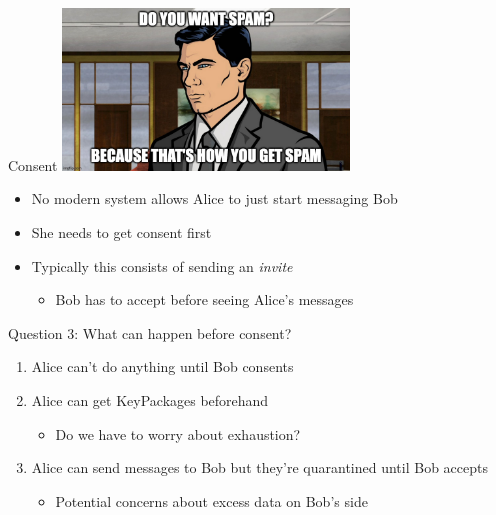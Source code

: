 \documentclass[helvetica]{beamer}
\begin{document}
\begin{frame}{Consent}
  \includegraphics[width=3in]{archer-spam}
  \begin{itemize}
  \item No modern system allows Alice to just start messaging Bob
  \item She needs to get consent first
  \item Typically this consists of sending an \emph{invite}
    \begin{itemize}
    \item Bob has to accept before seeing Alice's messages      
    \end{itemize}
  \end{itemize}
\end{frame}

\begin{frame}{Question 3: What can happen before consent?}
  \begin{enumerate}
  \item Alice can't do anything until Bob consents
  \item Alice can get KeyPackages beforehand
    \begin{itemize}
    \item Do we have to worry about exhaustion?
    \end{itemize}
  \item Alice can send messages to Bob but they're quarantined until Bob accepts
    \begin{itemize}
    \item Potential concerns about excess data on Bob's side      
    \end{itemize}
  \end{enumerate}
\end{frame}
\end{document}
